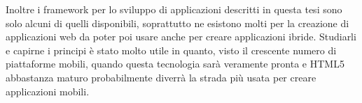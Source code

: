     Inoltre i framework per lo sviluppo di applicazioni \crossplat{} descritti
    in questa tesi sono solo alcuni di quelli disponibili, soprattutto ne
    esistono molti per la creazione di applicazioni web da poter poi usare
    anche per creare applicazioni ibride. Studiarli e capirne i principi è
    stato molto utile in quanto, visto il crescente numero di piattaforme
    mobili, quando questa tecnologia sarà veramente pronta e HTML5 abbastanza
    maturo probabilmente diverrà la strada più usata per creare applicazioni
    mobili.
